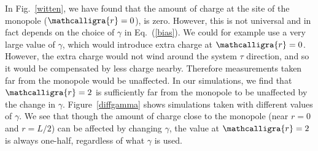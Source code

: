 \documentclass[prb,twocolumn]{revtex4-1}
\newcommand{\scripty}[1]{\ensuremath{\mathcalligra{#1}}}
\begin{document}
In Fig.~\ref{witten}, we have found that the amount of charge at the site of the monopole ($\scripty{r}=0$), is zero. However, this is not universal and in fact depends on the choice of $\gamma$ in Eq.~(\ref{bias}). We could for example use a very large value of $\gamma$, which would introduce extra charge at $\scripty{r}=0$. However, the extra charge would not wind around the system $\tau$ direction, and so it would be compensated by less charge nearby. Therefore measurements taken far from the monopole would be unaffected. In our simulations, we find that $\scripty{r}=2$ is sufficiently far from the monopole to be unaffected by the change in $\gamma$. Figure~\ref{diffgamma} shows simulations taken with different values of $\gamma$. We see that though the amount of charge close to the monopole (near $r=0$ and $r=L/2$) can be affected by changing $\gamma$, the value at $\scripty{r}=2$ is always one-half, regardless of what $\gamma$ is used.
\end{document}
